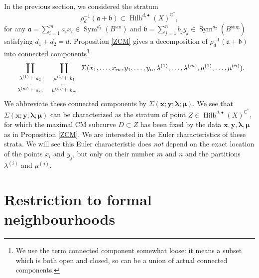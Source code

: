 \documentclass{amsart}
\theoremstyle{definition}
\newcommand{\CC} {\mathbb{C}}          %
\newcommand{\Sym}{\operatorname{Sym}}
\newcommand{\Hilb}{\operatorname{Hilb}}
\newcommand{\sm}{\operatorname{sm}}
\newcommand{\sing}{\operatorname{sing}}
\begin{document}

In the previous section, we considered the stratum
$$
\rho_{d}^{-1} ( \mathfrak{a} + \mathfrak{b} ) \subset \Hilb^{d, \bullet}(X)^{\CC^*},
$$
for any $\mathfrak{a} = \sum_{i=1}^{m} a_i x_i \in \Sym^{d_1}(B^{\sm})$ and $\mathfrak{b} = \sum_{j=1}^{n} b_j y_j \in \Sym^{d_2}(B^{\sing})$ satisfying $d_1+d_2=d$. Proposition \ref{ZCM} gives a decomposition of $\rho_{d}^{-1} ( \mathfrak{a} + \mathfrak{b} )$ into connected components\footnote{We use the term connected component somewhat loose: it means a subset which is both open and closed, so can be a union of actual connected components.}
\begin{equation} \label{comps}
\coprod_{{\scriptsize{\begin{array}{c} \lambda^{(1)} \vdash a_1 \\ \cdots \\ \lambda^{(m)} \vdash a_m \end{array}}}} \coprod_{\scriptsize{\begin{array}{c} \mu^{(1)} \vdash b_1 \\ \cdots \\ \mu^{(m)} \vdash b_m \end{array}}} \Sigma(x_1, \ldots, x_m, y_1, \ldots, y_n, \lambda^{(1)}, \ldots, \lambda^{(m)}, \mu^{(1)}, \ldots, \mu^{(n)}).
\end{equation}
We abbreviate these connected components by $\Sigma(\boldsymbol{x};\boldsymbol{y};\boldsymbol{\lambda};\boldsymbol{\mu})$. We see that $\Sigma(\boldsymbol{x};\boldsymbol{y};\boldsymbol{\lambda};\boldsymbol{\mu})$ can be characterized as the stratum of point $Z \in \Hilb^{d,\bullet}(X)^{\CC^*}$, for which the maximal CM subcurve $D \subset Z$ has been fixed by the data $\boldsymbol{x}, \boldsymbol{y}, \boldsymbol{\lambda}, \boldsymbol{\mu}$ as in Proposition \ref{ZCM}. We are interested in the Euler characteristics of these strata. We will see this Euler characteristic does \emph{not} depend on the exact location of the points $x_i$ and $y_j$, but only on their number $m$ and $n$ and the partitions $\lambda^{(i)}$ and $\mu^{(j)}$.


\section{Restriction to formal neighbourhoods} \label{formal}
\end{document}
